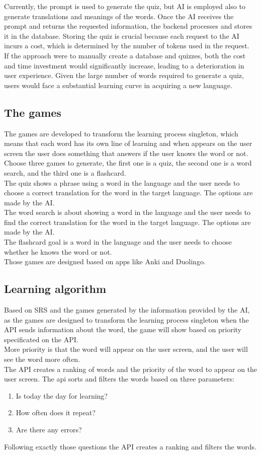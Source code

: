 \documentclass[12pt]{article}
\begin{document}
  Currently, the prompt is used to generate the quiz, but AI is employed also to generate translations and meanings of the words. Once the AI receives the prompt and returns the requested information, the backend processes and stores it in the database. Storing the quiz is crucial because each request to the AI incurs a cost, which is determined by the number of tokens used in the request. \\
  If the approach were to manually create a database and quizzes, both the cost and time investment would significantly increase, leading to a deterioration in user experience. Given the large number of words required to generate a quiz, users would face a substantial learning curve in acquiring a new language.

\subsection{The games}
  The games are developed to transform the learning process singleton, which means that each word has its own line of learning and when appears on the user screen the user does something that answers if the user knows the word or not. \\
  Choose three games to generate, the first one is a quiz, the second one is a word search, and the third one is a flashcard. \\
  The quiz shows a phrase using a word in the language and the user needs to choose a correct translation for the word in the target language. The options are made by the AI. \\
  The word search is about showing a word in the language and the user needs to find the correct translation for the word in the target language. The options are made by the AI. \\
  The flashcard goal is  a word in the language and the user needs to choose whether he knows the word or not. \\
  Those games are designed based on apps like Anki and Duolingo.
\subsection{Learning algorithm}
Based on SRS and the games generated by the information provided by the AI, as the games are designed to transform the learning process singleton when the API sends information about the word, the game will show based on priority specificated on the API. \\
More priority is that the word will appear on the user screen, and the user will see the word more often. \\
The API creates a ranking of words and the priority of the word to appear on the user screen. The api sorts and filters the words based on three parameters: 
\begin{enumerate}
  \item Is today the day for learning?
  \item How often does it repeat? 
  \item Are there any errors?
\end{enumerate}
Following exactly those questions the API creates a ranking and filters the words. \\
\end{document}

